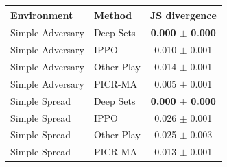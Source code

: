 \begin{tabular}{llc}
\toprule
Environment & Method & JS divergence \\
\midrule
Simple Adversary & Deep Sets & \textbf{0.000 $\pm$ 0.000} \\
Simple Adversary & IPPO & 0.010 $\pm$ 0.001 \\
Simple Adversary & Other-Play & 0.014 $\pm$ 0.001 \\
Simple Adversary & PICR-MA & 0.005 $\pm$ 0.001 \\
Simple Spread & Deep Sets & \textbf{0.000 $\pm$ 0.000} \\
Simple Spread & IPPO & 0.026 $\pm$ 0.001 \\
Simple Spread & Other-Play & 0.025 $\pm$ 0.003 \\
Simple Spread & PICR-MA & 0.013 $\pm$ 0.001 \\
\bottomrule
\end{tabular}
